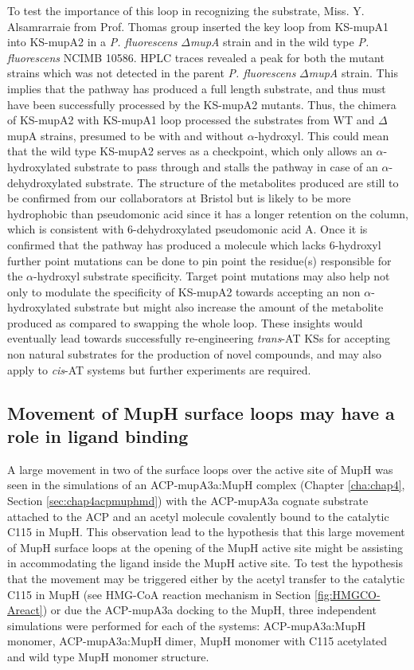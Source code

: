 	To test the importance of this loop in recognizing the substrate, Miss. Y. Alsamrarraie from Prof. Thomas group inserted the key loop from KS-mupA1 into KS-mupA2 in a \textit{P. fluorescens} $ \Delta $\textit{mupA} strain and in the wild type \textit{P. fluorescens} NCIMB 10586. HPLC traces revealed a peak for both the mutant strains which was not detected in the parent \textit{P. fluorescens} $ \Delta $\textit{mupA} strain. This implies that the pathway has produced a full length substrate, and thus must have been successfully processed by the KS-mupA2 mutants. Thus, the chimera of KS-mupA2 with KS-mupA1 loop processed the substrates from WT and $ \Delta $mupA strains, presumed to be with and without $ \alpha $-hydroxyl. This could mean that the wild type KS-mupA2 serves as a checkpoint, which only allows an $ \alpha $-hydroxylated substrate to pass through and stalls the pathway in case of an $ \alpha $-dehydroxylated substrate. The structure of the metabolites produced are still to be confirmed from our collaborators at Bristol but is likely to be more hydrophobic than pseudomonic acid since it has a longer retention on the column, which is consistent with 6-dehydroxylated pseudomonic acid A. Once it is confirmed that the pathway has produced a molecule which lacks 6-hydroxyl further point mutations can be done to pin point the residue(s) responsible for the $ \alpha $-hydroxyl substrate specificity. Target point mutations may also help not only to modulate the specificity of KS-mupA2 towards accepting an non $ \alpha $-hydroxylated substrate but might also increase the amount of the metabolite produced as compared to swapping the whole loop. These insights would eventually lead towards successfully re-engineering \textit{trans}-AT KSs for accepting non natural substrates for the production of novel compounds, and may also apply to \textit{cis}-AT systems but further experiments are required. 
	 
	
	\subsection{Movement of MupH surface loops may have a role in ligand binding}
	\label{sec:chap6DiscussionLoopMovement}
	A large movement in two of the surface loops over the active site of MupH was seen in the simulations of an ACP-mupA3a:MupH complex (Chapter \ref{cha:chap4}, Section \ref{sec:chap4acpmuphmd}) with the ACP-mupA3a cognate substrate attached to the ACP and an acetyl molecule covalently bound to the catalytic C115 in MupH. This observation lead to the hypothesis that this large movement of MupH surface loops at the opening of the MupH active site might be assisting in accommodating the ligand inside the MupH active site. To test the hypothesis that the movement may be triggered either by the acetyl transfer to the catalytic C115 in MupH (see HMG-CoA reaction mechanism in Section \ref{fig:HMGCO-Areact}) or due the ACP-mupA3a docking to the MupH, three independent simulations were performed for each of the systems: ACP-mupA3a:MupH monomer, ACP-mupA3a:MupH dimer, MupH monomer with C115 acetylated and wild type MupH monomer structure.
	
